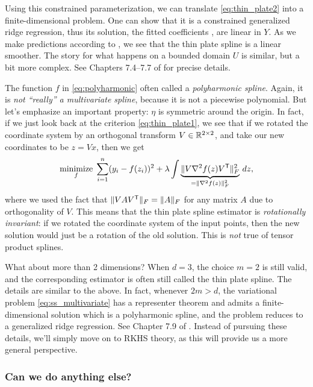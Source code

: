 \documentclass{article}
\begin{document}
Using this constrained parameterization, we can translate \eqref{eq:thin_plate2}
into a finite-dimensional problem. One can show that it is a constrained
generalized ridge regression, thus its solution, the fitted coefficients
, are linear in $Y$. As we make predictions
according to , we see that the thin plate spline is a linear smoother.
The story for what happens on a bounded domain $U$ is similar, but a bit more
complex. See Chapters 7.4--7.7 of \citet{green1993nonparametric} for precise
details.      

The function $f$ in \eqref{eq:polyharmonic} often called a \emph{polyharmonic
  spline}. Again, it is \emph{not ``really'' a multivariate spline}, because it
is not a piecewise polynomial. But let's emphasize an important property: $\eta$
is symmetric around the origin. In fact, if we just look back at the criterion
\eqref{eq:thin_plate1}, we see that if we rotated the coordinate system by an
orthogonal transform $V \in \mathbb{R}^{2 \times 2}$, and take our new coordinates to be
$z=Vx$, then we get  
\[
\mathop{\mathrm{minimize}}_f \; \sum_{i=1}^n (y_i - f(z_i))^2 + \lambda \int \underbrace{\| V
  \nabla^2 f(z) V^{\mathsf{T}}\|_F^2}_{= \|\nabla^2 f(z)\|_F^2} \, dz,   
\]
where we used the fact that $\|V A V^{\mathsf{T}}\|_F = \|A\|_F$ for any matrix $A$ due to
orthogonality of $V$. This means that the thin plate spline estimator is
\emph{rotationally invariant}: if we rotated the coordinate system of the input
points, then the new solution would just be a rotation of the old solution. This
is \emph{not} true of tensor product splines. 

What about more than 2 dimensions? When $d=3$, the choice $m=2$ is still
valid, and the corresponding estimator is often still called the thin plate
spline. The details are similar to the above. In fact, whenever $2m > d$, the 
variational problem \eqref{eq:ss_multivariate} has a representer theorem and
admits a finite-dimensional solution which is a polyharmonic spline, and the
problem reduces to a generalized ridge regression. See Chapter 7.9 of
\citet{green1993nonparametric}. Instead of pursuing these details, we'll simply
move on to RKHS theory, as this will provide us a more general perspective. 

\subsubsection{Can we do anything else?}
\end{document}
